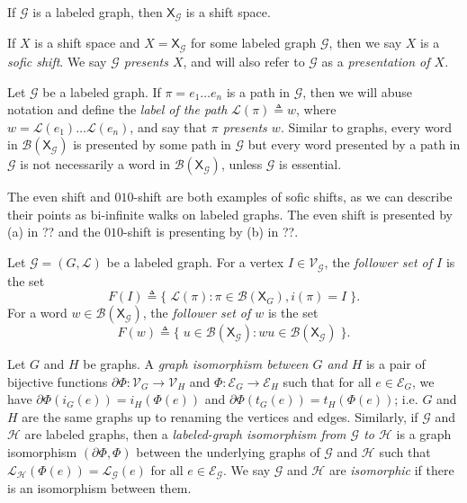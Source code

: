 \documentclass[hidelinks]{article}
\newcommand{\Lc}{\mathcal{L}}  %
\newcommand{\Gc}{\mathcal{G}}  %
\newcommand{\Hc}{\mathcal{H}}  %
\newcommand{\Vc}{\mathcal{V}}
\newcommand{\Ec}{\mathcal{E}}
\newcommand{\Bc}{\mathcal{B}}
\newcommand{\shift}[1]{\mathsf{X}_{#1}}
\newcommand{\term}[1]{\textit{#1}}
\theoremstyle{definition}
\begin{document}
\begin{theorem}[name=\cite{lind1995introduction}]
    If \(\Gc\) is a labeled graph, then \(\shift{\Gc}\) is a shift space.
\end{theorem}

If \(X\) is a shift space and \(X = \shift{\Gc}\) for some labeled graph \(\Gc\), 
then we say \(X\) is a \term{sofic shift}. We say \term{\(\Gc\) presents \(X\)}, 
and will also refer to \(\Gc\) as a \term{presentation of \(X\)}. 

Let \(\Gc\) be a labeled graph. 
If \(\pi = e_1 \dots e_n\) is a path in \(\Gc\), then we will abuse notation and 
define the \term{label of the path} \(\Lc(\pi) \triangleq w\),
where \(w = \Lc(e_1) \dots \Lc(e_n)\), and say that \term{\(\pi\)
presents \(w\)}. 
Similar to graphs, every word in \(\Bc(\shift{\Gc})\) is
presented by some path in \(\Gc\) but every word presented by a path in \(\Gc\) is 
not necessarily a word in \(\Bc(\shift{\Gc})\), unless \(\Gc\) is essential.

\begin{example}
    The even shift and \(010\)-shift are both examples of sofic shifts, as we 
    can describe their points as bi-infinite walks on labeled graphs. The even 
    shift is presented by (a) in ?? and the \(010\)-shift is presenting by (b) in ??.
\end{example}

\begin{definition}
    Let \(\Gc = (G, \Lc)\) be a labeled graph. For a vertex \(I \in \Vc_\Gc\), the 
    \term{follower set of \(I\)} is the set 
    \[F(I) \triangleq \big\{ \; \Lc(\pi) : \pi \in \Bc(\shift{G}), i(\pi) = I \; \big\}.\]
    For a word \(w \in \Bc(\shift{\Gc})\), the \term{follower set of \(w\)}
    is the set 
    \[F(w) \triangleq \big\{ \; u \in \Bc(\shift{\Gc}) : wu \in \Bc(\shift{\Gc}) \; \big\}.\]
\end{definition}


Let \(G\) and \(H\) be graphs. A \term{graph isomorphism between \(G\) and \(H\)}
is a pair of bijective functions \(\partial\Phi : \Vc_G \to \Vc_H\) and \(\Phi : \Ec_G \to \Ec_H\)
such that for all \(e \in \Ec_G\), we have \(\partial\Phi(i_G(e)) = i_H(\Phi(e))\)
and \(\partial\Phi(t_G(e)) = t_H(\Phi(e))\); i.e. \(G\) and \(H\) are the 
same graphs up to renaming the vertices and edges. Similarly, if \(\Gc\)
and \(\Hc\) are labeled graphs, then a \term{labeled-graph isomorphism from \(\Gc\) to \(\Hc\)}
is a graph isomorphism \((\partial\Phi, \Phi)\) between the underlying graphs of \(\Gc\)
and \(\Hc\) such that 
\(\Lc_\Hc(\Phi(e)) = \Lc_\Gc(e)\) for all \(e \in \Ec_\Gc\). We say 
\(\Gc\) and \(\Hc\) are \term{isomorphic} if there is an isomorphism between them.
\end{document}
